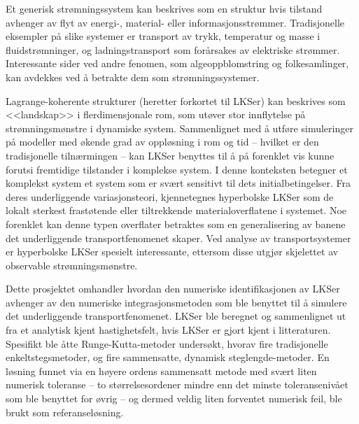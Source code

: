 Et generisk strømningssystem kan beskrives som en struktur hvis tilstand
avhenger av flyt av energi-, material- eller informasjonsstrømmer. Tradisjonelle
eksempler på slike systemer er transport av trykk, temperatur og masse i
fluidstrømninger, og ladningstransport som forårsakes av elektriske strømmer.
Interessante sider ved andre fenomen, som algeoppblomstring og folkesamlinger,
kan avdekkes ved å betrakte dem som strømningssystemer.

Lagrange-koherente strukturer (heretter forkortet til LKSer) kan beskrives som
<<landskap>> i flerdimensjonale rom, som utøver stor innflytelse på
strømningsmønstre i dynamiske system.
Sammenlignet med å utføre simuleringer på modeller med økende grad av oppløsning
i rom og tid -- hvilket er den tradisjonelle tilnærmingen -- kan LKSer benyttes
til å på forenklet vis kunne forutsi fremtidige tilstander i komplekse system.
I denne konteksten betegner et komplekst system et system som er svært sensitivt
til dets initialbetingelser.
Fra deres underliggende variasjonsteori, kjennetegnes hyperbolske LKSer som de
lokalt sterkest frastøtende eller tiltrekkende materialoverflatene i systemet.
Noe forenklet kan denne typen overflater betraktes som en generalisering av
banene det underliggende transportfenomenet skaper.
Ved analyse av transportsystemer er hyperbolske LKSer spesielt interessante,
ettersom disse utgjør skjelettet av observable strømningsmønstre.

Dette prosjektet omhandler hvordan den numeriske identifikasjonen av LKSer
avhenger av den numeriske integrasjonsmetoden som ble benyttet til å simulere
det underliggende transportfenomenet.
LKSer ble beregnet og sammenlignet ut fra et analytisk
kjent hastighetsfelt, hvis LKSer er gjort kjent i litteraturen. Spesifikt
ble åtte Runge-Kutta-metoder undersøkt, hvorav fire tradisjonelle
enkeltstegsmetoder, og fire sammensatte, dynamisk steglengde-metoder. En
løsning funnet via en høyere ordens sammensatt metode med svært liten
numerisk toleranse -- to størrelsesordener mindre enn det minste toleransenivået
som ble benyttet for
øvrig -- og dermed veldig liten forventet numerisk feil, ble brukt som
referanseløsning.%

